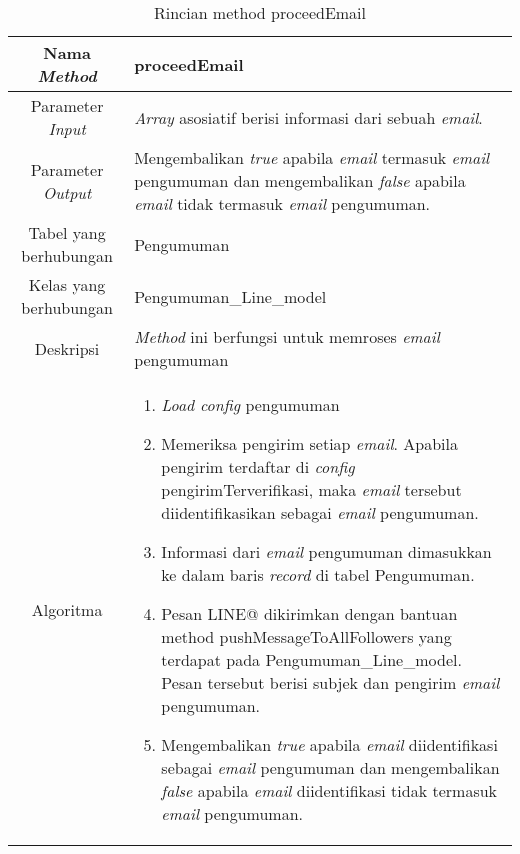\begin{center}
	\begin{table}[H]
	\caption{Rincian method proceedEmail}
	\label{table:pengumuman-model-proceedemail}
\begin{tabular}{|c|p{11cm}|}
\hline
Nama \textit{Method} 	& 	 proceedEmail	\\
\hline
Parameter \textit{Input} & \textit{Array} asosiatif berisi informasi dari sebuah \textit{email}. \\
\hline
Parameter \textit{Output} & Mengembalikan \textit{true} apabila \textit{email} termasuk \textit{email} pengumuman dan mengembalikan \textit{false} apabila \textit{email} tidak termasuk \textit{email} pengumuman.  \\
\hline
Tabel yang berhubungan & Pengumuman \\
\hline
Kelas yang berhubungan &  Pengumuman\_Line\_model \\
\hline
Deskripsi	& \textit{Method} ini berfungsi untuk memroses \textit{email} pengumuman\\
\hline
Algoritma	& \begin{enumerate}
				\item \textit{Load config} pengumuman
				\item Memeriksa pengirim setiap \textit{email}. Apabila pengirim terdaftar di \textit{config} pengirimTerverifikasi, maka \textit{email} tersebut diidentifikasikan sebagai \textit{email} pengumuman.
				\item Informasi dari \textit{email} pengumuman dimasukkan ke dalam baris \textit{record} di tabel Pengumuman.
				\item Pesan LINE@ dikirimkan dengan bantuan method pushMessageToAllFollowers yang terdapat pada Pengumuman\_Line\_model. Pesan tersebut berisi subjek dan pengirim \textit{email} pengumuman.
				\item Mengembalikan \textit{true} apabila  \textit{email} diidentifikasi sebagai  \textit{email} pengumuman dan mengembalikan \textit{false} apabila \textit{email} diidentifikasi tidak termasuk \textit{email} pengumuman.
				\end{enumerate} \\
\hline
\end{tabular}
\end{table}
\end{center}

